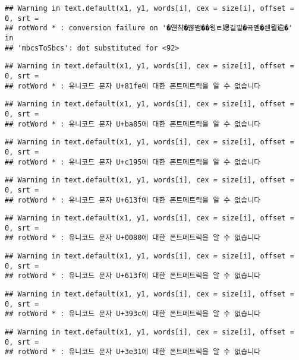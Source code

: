 \documentclass[]{article}
\begin{document}
\begin{verbatim}
## Warning in text.default(x1, y1, words[i], cex = size[i], offset = 0, srt =
## rotWord * : conversion failure on '�얜챸�뺞꽴��욍ㅌ媤길낄�곸몓�쇈묄逾�' in
## 'mbcsToSbcs': dot substituted for <92>
\end{verbatim}

\begin{verbatim}
## Warning in text.default(x1, y1, words[i], cex = size[i], offset = 0, srt =
## rotWord * : 유니코드 문자 U+81fe에 대한 폰트메트릭을 알 수 없습니다
\end{verbatim}

\begin{verbatim}
## Warning in text.default(x1, y1, words[i], cex = size[i], offset = 0, srt =
## rotWord * : 유니코드 문자 U+ba85에 대한 폰트메트릭을 알 수 없습니다
\end{verbatim}

\begin{verbatim}
## Warning in text.default(x1, y1, words[i], cex = size[i], offset = 0, srt =
## rotWord * : 유니코드 문자 U+c195에 대한 폰트메트릭을 알 수 없습니다
\end{verbatim}

\begin{verbatim}
## Warning in text.default(x1, y1, words[i], cex = size[i], offset = 0, srt =
## rotWord * : 유니코드 문자 U+613f에 대한 폰트메트릭을 알 수 없습니다
\end{verbatim}

\begin{verbatim}
## Warning in text.default(x1, y1, words[i], cex = size[i], offset = 0, srt =
## rotWord * : 유니코드 문자 U+0080에 대한 폰트메트릭을 알 수 없습니다
\end{verbatim}

\begin{verbatim}
## Warning in text.default(x1, y1, words[i], cex = size[i], offset = 0, srt =
## rotWord * : 유니코드 문자 U+613f에 대한 폰트메트릭을 알 수 없습니다
\end{verbatim}

\begin{verbatim}
## Warning in text.default(x1, y1, words[i], cex = size[i], offset = 0, srt =
## rotWord * : 유니코드 문자 U+393c에 대한 폰트메트릭을 알 수 없습니다
\end{verbatim}

\begin{verbatim}
## Warning in text.default(x1, y1, words[i], cex = size[i], offset = 0, srt =
## rotWord * : 유니코드 문자 U+3e31에 대한 폰트메트릭을 알 수 없습니다
\end{verbatim}
\end{document}
